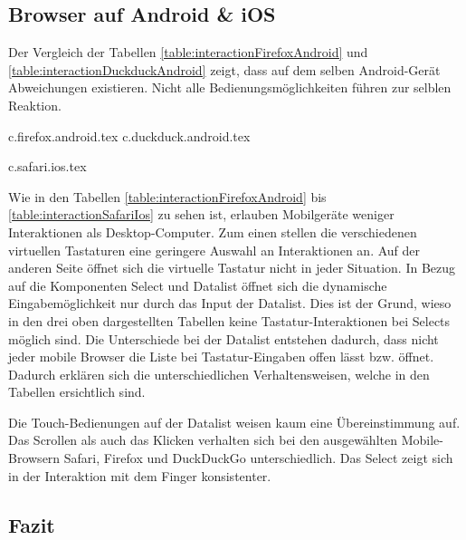 \clearpage
\subsection{Browser auf Android \& iOS}
\label{sec:mobileBrowser}

Der Vergleich der Tabellen \ref{table:interactionFirefoxAndroid} und \ref{table:interactionDuckduckAndroid} zeigt, dass auf dem selben Android-Gerät Abweichungen existieren.
Nicht alle Bedienungsmöglichkeiten führen zur selblen Reaktion.

{c.firefox.android.tex}
{c.duckduck.android.tex}

\clearpage
{c.safari.ios.tex}

Wie in den Tabellen \ref{table:interactionFirefoxAndroid} bis \ref{table:interactionSafariIos} zu sehen ist, erlauben Mobilgeräte weniger Interaktionen als Desktop-Computer.
Zum einen stellen die verschiedenen virtuellen Tastaturen eine geringere Auswahl an Interaktionen an.
Auf der anderen Seite öffnet sich die virtuelle Tastatur nicht in jeder Situation. 
In Bezug auf die Komponenten Select und Datalist öffnet sich die dynamische Eingabemöglichkeit nur durch das Input der Datalist.
Dies ist der Grund, wieso in den drei oben dargestellten Tabellen keine Tastatur-Interaktionen bei Selects möglich sind. 
Die Unterschiede bei der Datalist entstehen dadurch, dass nicht jeder mobile Browser die Liste bei Tastatur-Eingaben offen lässt bzw. öffnet.
Dadurch erklären sich die unterschiedlichen Verhaltensweisen, welche in den Tabellen ersichtlich sind.

Die Touch-Bedienungen auf der Datalist weisen kaum eine Übereinstimmung auf. 
Das Scrollen als auch das Klicken verhalten sich bei den ausgewählten Mobile-Browsern Safari, Firefox und DuckDuckGo unterschiedlich.
Das Select zeigt sich in der Interaktion mit dem Finger konsistenter. 


\clearpage
\subsection{Fazit}
\label{sec:summeryExisting}

